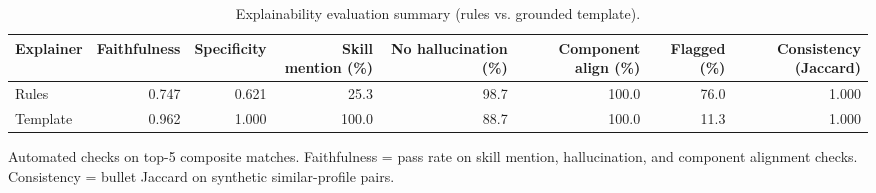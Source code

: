 \begin{table}[htbp]
\centering
\caption{Explainability evaluation summary (rules vs. grounded template).}
\label{tab:explanation-quality}
\begin{tabular}{lrrrrrrr}
\toprule
Explainer & Faithfulness & Specificity & Skill mention (\%) & No hallucination (\%) & Component align (\%) & Flagged (\%) & Consistency (Jaccard) \\
\midrule
Rules & 0.747 & 0.621 & 25.3 & 98.7 & 100.0 & 76.0 & 1.000 \\
Template & 0.962 & 1.000 & 100.0 & 88.7 & 100.0 & 11.3 & 1.000 \\
\bottomrule
\end{tabular}
\footnotesize{Automated checks on top-5 composite matches. Faithfulness = pass rate on skill mention, hallucination, and component alignment checks. Consistency = bullet Jaccard on synthetic similar-profile pairs.}
\end{table}
